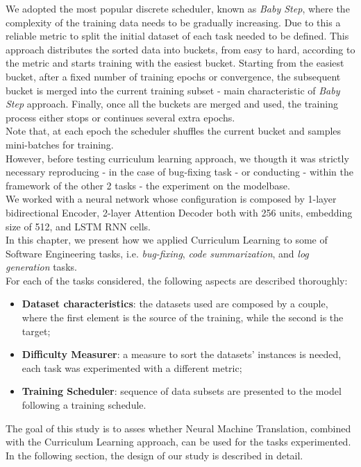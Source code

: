 We adopted the most popular discrete scheduler, known as \textit{Baby Step}, where the complexity of the training
data needs to be gradually increasing. Due to this a reliable metric to split the initial dataset of each task needed to be defined.
This approach distributes the sorted data into buckets, from easy to hard, according to the metric and starts training with the easiest bucket. 
Starting from the easiest bucket, after a fixed number of training epochs or convergence, the subsequent bucket is merged
into the current training subset - main characteristic of \textit{Baby Step} approach.
Finally, once all the buckets are merged and used, the
training process either stops or continues several extra epochs.\\
Note that, at each epoch the scheduler shuffles the current bucket and samples mini-batches for training.\\

However, before testing curriculum learning approach, we thougth it was strictly necessary reproducing - in the case 
of bug-fixing task - or conducting -  within the framework of the other 2 tasks - the experiment on the modelbase.\\
We worked with a neural network whose configuration is composed by 1-layer bidirectional Encoder, 2-layer Attention 
Decoder both with 256 units, embedding size of 512, and LSTM RNN cells.\\

In this chapter, we present how we applied Curriculum Learning to some of Software
Engineering tasks, i.e. \textit{bug-fixing}, \textit{code summarization}, and \textit{log generation}
tasks. \\
For each of the tasks considered, the following aspects are described thoroughly:
\begin{itemize}
    \item \textbf{Dataset characteristics}: the datasets used are composed by a couple, where the first element is the source of the training, while the second is the target;
    \item \textbf{Difficulty Measurer}: a measure to sort the datasets' instances is needed, each task was experimented with a different metric; 
    \item \textbf{Training Scheduler}: sequence of data subsets are presented to the model following a training schedule.
\end{itemize}


The goal of this study is to asses whether Neural Machine Translation, combined with the Curriculum Learning approach, 
can be used for the tasks experimented. In the following section, the design of our study is described in detail.

